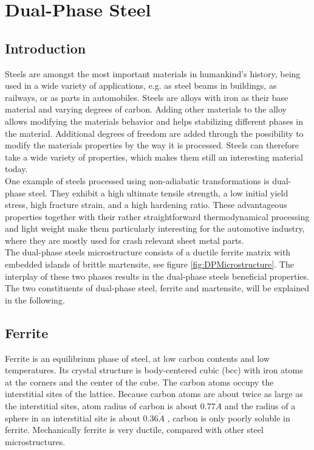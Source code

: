 \chapter{Dual-Phase Steel}
\label{cha:DualPhaseSteels}

\section{Introduction}

Steels are amongst the most important materials in humankind's history, being used in a wide variety of applications, e.g. as steel beams in buildings, as railways, or as parts in automobiles. Steels are alloys with iron as their base material and varying degrees of carbon. Adding other materials to the alloy allows modifying the materials behavior and helps stabilizing different phases in the material. Additional degrees of freedom are added through the possibility to modify the materials properties by the way it is processed. Steels can therefore take a wide variety of properties, which makes them still an interesting material today. \\


One example of steels processed using non-adiabatic transformations is dual-phase steel. They exhibit a high ultimate tensile strength, a low initial yield stress, high fracture strain, and a high hardening ratio. These advantageous properties together with their rather straightforward thermodynamical processing and light weight make them particularly interesting for the automotive industry, where they are mostly used for crash relevant sheet metal parts. \\

The dual-phase steels microstructure consists of a ductile ferrite matrix with embedded islands of brittle martensite, see figure \ref{fig:DPMicrostructure}. The interplay of these two phases results in the dual-phase steels beneficial properties. The two constituents of dual-phase steel, ferrite and martensite, will be explained in the following. \\

\section{Ferrite}

Ferrite is an equilibrium phase of steel, at low carbon contents and low temperatures. Its crystal structure is body-centered cubic (bcc) with iron atoms at the corners and the center of the cube. The carbon atoms occupy the interstitial sites of the lattice. Because carbon atoms are about twice as large as the interstitial sites, atom radius of carbon is about $0.77  \mathring{A}$ and the radius of a sphere in an interstitial site is about $0.36 \mathring{A}$ \cite{Bleck2016}, carbon is only poorly soluble in ferrite. Mechanically ferrite is very ductile, compared with other steel microstructures.  \\

